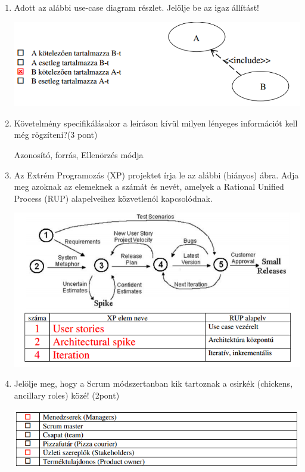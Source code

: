\begin{enumerate}
	\item Adott az alábbi use-case diagram részlet. Jelölje be az igaz állítást!

				\begin{center}
					\includegraphics[scale=0.7]{img/table4}
				\end{center}

	\item Követelmény specifikálásakor a leíráson kívül milyen lényeges információt kell még rögzíteni?(3 pont)

		Azonosító, forrás, Ellenörzés módja

	\item Az Extrém Programozás (XP) projektet írja le az alábbi (hiányos) ábra. Adja meg azoknak az elemeknek a számát és nevét, amelyek a Rational Unified Process (RUP) alapelveihez közvetlenól kapcsolódnak.

		\begin{center}
			\includegraphics[scale=0.7]{img/table6}
		\end{center}

	\item Jelölje meg, hogy a Scrum módszertanban kik tartoznak a csirkék (chickens, ancillary roles) közé! (2pont)

		\begin{center}
			\includegraphics[scale=0.7]{img/table7}
		\end{center}


\end{enumerate}
